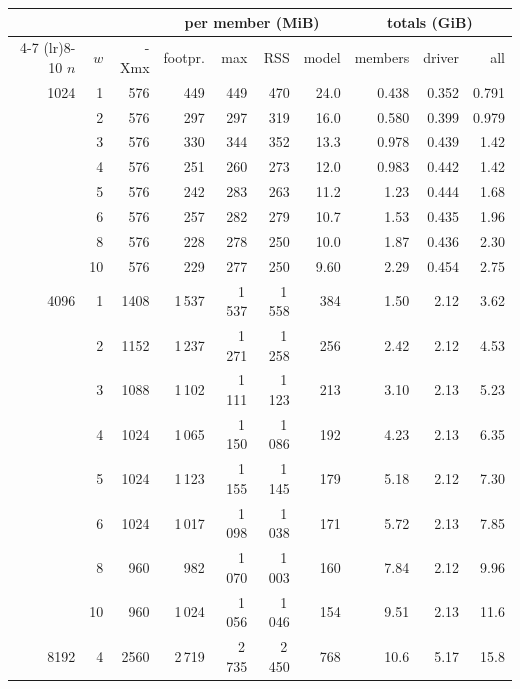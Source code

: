 \begin{tabular}{rrrrrrrrrr}
\toprule
 & & & \multicolumn{4}{c}{per member (MiB)} & \multicolumn{3}{c}{totals (GiB)} \\ \cmidrule(lr){4-7} \cmidrule(lr){8-10} $n$ & $w$ & -Xmx & footpr. & max & RSS & model & members & driver & all \\
\midrule
1024 & 1 & 576 & 449 & 449 & 470 & 24.0 & 0.438 & 0.352 & 0.791 \\
 & 2 & 576 & 297 & 297 & 319 & 16.0 & 0.580 & 0.399 & 0.979 \\
 & 3 & 576 & 330 & 344 & 352 & 13.3 & 0.978 & 0.439 & 1.42 \\
 & 4 & 576 & 251 & 260 & 273 & 12.0 & 0.983 & 0.442 & 1.42 \\
 & 5 & 576 & 242 & 283 & 263 & 11.2 & 1.23 & 0.444 & 1.68 \\
 & 6 & 576 & 257 & 282 & 279 & 10.7 & 1.53 & 0.435 & 1.96 \\
 & 8 & 576 & 228 & 278 & 250 & 10.0 & 1.87 & 0.436 & 2.30 \\
 & 10 & 576 & 229 & 277 & 250 & 9.60 & 2.29 & 0.454 & 2.75 \\
\midrule
4096 & 1 & 1408 & 1\,537 & 1\,537 & 1\,558 & 384 & 1.50 & 2.12 & 3.62 \\
 & 2 & 1152 & 1\,237 & 1\,271 & 1\,258 & 256 & 2.42 & 2.12 & 4.53 \\
 & 3 & 1088 & 1\,102 & 1\,111 & 1\,123 & 213 & 3.10 & 2.13 & 5.23 \\
 & 4 & 1024 & 1\,065 & 1\,150 & 1\,086 & 192 & 4.23 & 2.13 & 6.35 \\
 & 5 & 1024 & 1\,123 & 1\,155 & 1\,145 & 179 & 5.18 & 2.12 & 7.30 \\
 & 6 & 1024 & 1\,017 & 1\,098 & 1\,038 & 171 & 5.72 & 2.13 & 7.85 \\
 & 8 & 960 & 982 & 1\,070 & 1\,003 & 160 & 7.84 & 2.12 & 9.96 \\
 & 10 & 960 & 1\,024 & 1\,056 & 1\,046 & 154 & 9.51 & 2.13 & 11.6 \\
\midrule
8192 & 4 & 2560 & 2\,719 & 2\,735 & 2\,450 & 768 & 10.6 & 5.17 & 15.8 \\
\bottomrule
\end{tabular}
\par{}

